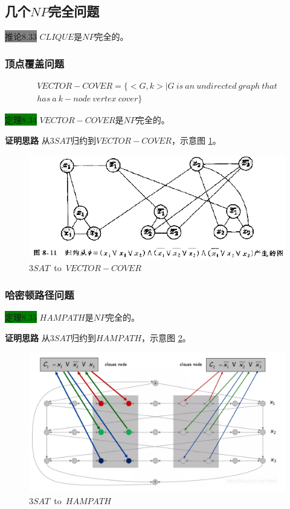 \documentclass[a4paper]{article}
\begin{document}
\subsection{几个$NP$完全问题}

	\colorbox{gray}{推论8.33} $CLIQUE$是$NP$完全的。

\subsubsection{顶点覆盖问题}
	
	\begin{multline}
		VECTOR-COVER=\{<G,k>|G~is~an~undirected~graph~that \\
							has~a~k-node~vertex~cover\}
	\end{multline}
	
	\colorbox{green}{定理8.34} $VECTOR-COVER$是$NP$完全的。
	
	\textbf{证明思路} \quad 从$3SAT$归约到$VECTOR-COVER$，示意图 \ref{F080501}。

	\begin{figure}[htb]
		\centering
		\includegraphics[scale=0.8]{./figure/8.5.1.png}
		\caption{$3SAT$~to~$VECTOR-COVER$}
		\label{F080501}
   \end{figure} 

\subsubsection{哈密顿路径问题}

	\colorbox{green}{定理8.35} $HAMPATH$是$NP$完全的。
	
	\textbf{证明思路} \quad 从$3SAT$归约到$HAMPATH$，示意图 \ref{F080502}。
	
	\begin{figure}[htb]
		\centering
		\includegraphics[scale=0.6]{./figure/8.5.2.png}
		\caption{$3SAT$~to~$HAMPATH$}
		\label{F080502}
   \end{figure} 
\end{document}
